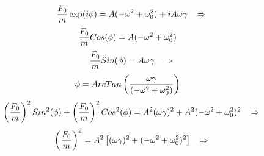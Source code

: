 \documentclass[a4paper]{article}
\begin{document}
\begin{answer}[Problema 5.]
\begin{enumerate}
\begin{equation*}
\begin{split}
                     \frac{F_0}{m} \exp(i\phi)
                     &= A(-\omega^2  + \omega_0^2) + iA\omega\gamma\hspace{0.3cm} \Rightarrow\\
                 \end{split}
             \end{equation*}
             \begin{equation*}
                 \begin{split}
                     \frac{F_0}{m} Cos(\phi)
                     = A(-\omega^2  + \omega_0^2) \hspace{0.3cm} 
                 \end{split}
             \end{equation*}
               \begin{equation*}
                 \begin{split}
                     \frac{F_0}{m} Sin(\phi)
                     &= A\omega\gamma\hspace{0.3cm} \Rightarrow\\
                 \end{split}
             \end{equation*}
             \begin{equation*}
                 \begin{split}
                      \phi
                     &=ArcTan\left(\frac{ \omega\gamma}{ (-\omega^2  + \omega_0^2)}\right)\hspace{0.3cm}\\
                 \end{split}
             \end{equation*}
             \begin{equation*}
                 \begin{split}
                     \left(\frac{F_0}{m}\right)^2 Sin^2(\phi) +  \left(\frac{F_0}{m}\right)^2 Cos^2(\phi)  
                     &= A^2(\omega\gamma)^2+ A^2(-\omega^2  + \omega_0^2)^2\hspace{0.3cm} \Rightarrow\\
                 \end{split}
             \end{equation*}
              \begin{equation*}
                 \begin{split}
                     \left(\frac{F_0}{m}\right)^2
                     &= A^2\left[(\omega\gamma)^2+ (-\omega^2  + \omega_0^2)^2\right]\hspace{0.3cm} \Rightarrow\\

\end{split}
\end{equation*}
\end{enumerate}
\end{answer}
\end{document}
